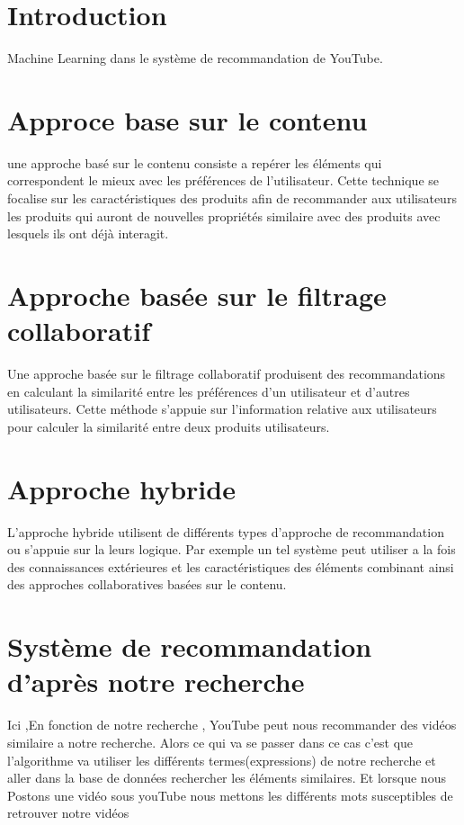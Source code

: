 \documentclass[12pt,a4paper]{article}
\begin{document}
\section{Introduction}
   Machine Learning dans le système de recommandation de YouTube.
\section{Approce base sur le contenu}	
 une approche basé sur le contenu consiste a repérer les éléments qui correspondent le mieux avec les préférences de l'utilisateur. Cette technique se focalise sur les caractéristiques des produits afin de recommander aux utilisateurs les produits qui auront de nouvelles propriétés 
similaire avec des produits avec lesquels ils ont déjà interagit. 
\section{Approche basée sur le filtrage collaboratif }	
Une approche basée sur le filtrage collaboratif produisent des recommandations en calculant la similarité entre les préférences d'un utilisateur et d'autres utilisateurs. Cette méthode s'appuie sur l'information relative aux utilisateurs pour calculer la similarité entre deux produits utilisateurs.
\section{Approche hybride}
L'approche hybride utilisent de différents types d'approche de recommandation ou s'appuie sur la leurs logique. Par exemple un tel système peut utiliser a la fois des connaissances extérieures et les caractéristiques des éléments combinant ainsi des approches collaboratives basées sur le contenu.	
\section{Système de recommandation d'après notre recherche}
Ici ,En fonction de notre recherche , YouTube peut nous recommander des vidéos similaire a notre
recherche. Alors ce qui va se passer dans ce cas c'est que l'algorithme va utiliser les différents termes(expressions) de notre recherche et aller
dans la base de données rechercher les éléments similaires. Et lorsque nous Postons une vidéo sous youTube nous mettons les différents mots 
susceptibles de retrouver notre vidéos 
\end{document}
